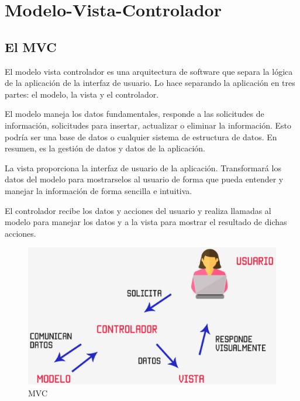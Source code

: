 \section{Modelo-Vista-Controlador}
\label{:sec3}

\subsection{El MVC}
\label{3:3:1}

El modelo vista controlador es una arquitectura de software que separa la lógica de la aplicación de la interfaz de usuario. Lo hace separando la aplicación en tres partes: el modelo, la vista y el controlador.

El modelo maneja los datos fundamentales, responde a las solicitudes de información, solicitudes para insertar, actualizar o eliminar la información. Esto podría ser una base de datos o cualquier sistema de estructura de datos. En resumen, es la gestión de datos y datos de la aplicación.

La vista proporciona la interfaz de usuario de la aplicación. Transformará los datos del modelo para mostrarselos al usuario de forma que pueda entender y manejar la información de forma sencilla e intuitiva.

El controlador recibe los datos y acciones del usuario y realiza llamadas al modelo para manejar los datos y a la vista para mostrar el resultado de dichas acciones.

\begin{figure}[!th]
\begin{center}
\includegraphics[scale=0.3]{images/29}
\caption{MVC}
\label{fig:MVC}
\end{center}
\end{figure}

